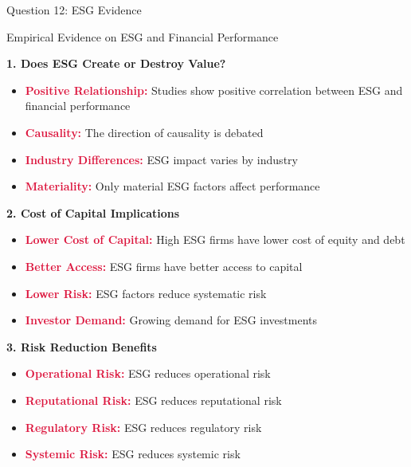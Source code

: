 \documentclass[aspectratio=169]{beamer}
\newcommand{\highlight}[1]{\textcolor{crimson}{\textbf{#1}}}
\begin{document}
	\begin{frame}{Question 12: ESG Evidence}
		
		\begin{block}{Empirical Evidence on ESG and Financial Performance}
			
			\textbf{1. Does ESG Create or Destroy Value?}
			\begin{itemize}
				\item \highlight{Positive Relationship:} Studies show positive correlation between ESG and financial performance
				\item \highlight{Causality:} The direction of causality is debated
				\item \highlight{Industry Differences:} ESG impact varies by industry
				\item \highlight{Materiality:} Only material ESG factors affect performance
			\end{itemize}
			
			\textbf{2. Cost of Capital Implications}
			\begin{itemize}
				\item \highlight{Lower Cost of Capital:} High ESG firms have lower cost of equity and debt
				\item \highlight{Better Access:} ESG firms have better access to capital
				\item \highlight{Lower Risk:} ESG factors reduce systematic risk
				\item \highlight{Investor Demand:} Growing demand for ESG investments
			\end{itemize}
			
			\textbf{3. Risk Reduction Benefits}
			\begin{itemize}
				\item \highlight{Operational Risk:} ESG reduces operational risk
				\item \highlight{Reputational Risk:} ESG reduces reputational risk
				\item \highlight{Regulatory Risk:} ESG reduces regulatory risk
				\item \highlight{Systemic Risk:} ESG reduces systemic risk
			\end{itemize}
		\end{block}
	\end{frame}
	
\end{document}
